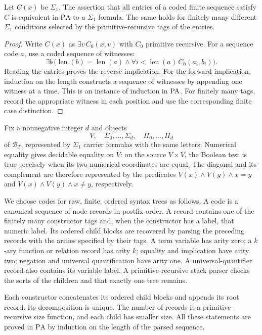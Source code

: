 \begin{lemma}
\label{lem:st-finite-sigma1}
Let $C(x)$ be $\Sigma_1$. The assertion that all entries of a coded
finite sequence satisfy $C$ is equivalent in $\mathrm{PA}$ to a
$\Sigma_1$ formula. The same holds for finitely many different
$\Sigma_1$ conditions selected by the primitive-recursive tags of
the entries.
\end{lemma}
\begin{proof}
Write $C(x)$ as $\exists v\,C_0(x,v)$ with $C_0$ primitive recursive.
For a sequence code $a$, use a coded sequence of witnesses:
\[
 \exists b\,\bigl(\operatorname{len}(b)=\operatorname{len}(a)
   \land\forall i<\operatorname{len}(a)\,
                  C_0(a_i,b_i)\bigr).
\]
Reading the entries proves the reverse implication. For the forward implication,
induction on the length constructs a sequence of witnesses by
appending one witness at a time. This is an instance of induction in $\mathrm{PA}$.
For finitely many tags, record the appropriate witness in each
position and use the corresponding finite case distinction.
\end{proof}

Fix a nonnegative integer $d$ and objects
\[
 V,\quad \Sigma_0,\ldots,\Sigma_d,\quad
 \Pi_0,\ldots,\Pi_d
\]
of $\mathcal B_T$, represented by $\Sigma_1$ carrier formulas with
the same letters. Numerical equality gives decidable equality on
$V$: on the source $V\times V$, the Boolean test is true precisely
when its two numerical coordinates are equal. The diagonal and its
complement are therefore represented by the predicates
$V(x)\land V(y)\land x=y$ and
$V(x)\land V(y)\land x\ne y$, respectively.

We choose codes for raw, finite, ordered syntax trees as follows.
A code is a canonical sequence of node records in postfix order.
A record contains one of the finitely many constructor tags and,
when the constructor has a label, that numeric label. Its ordered
child blocks are recovered by parsing the preceding records with
the arities specified by their tags. A term variable has arity zero; a
$k$-ary function or relation record has arity $k$; equality and
implication have arity two; negation and universal quantification
have arity one. A universal-quantifier record also contains its
variable label. A primitive-recursive stack parser checks the
sorts of the children and that exactly one tree remains.

Each constructor concatenates its ordered child blocks and appends
its root record. Its decomposition is unique. The number of records
is a primitive-recursive size function, and each child has smaller
size. All these statements are proved in $\mathrm{PA}$ by induction
on the length of the parsed sequence.

